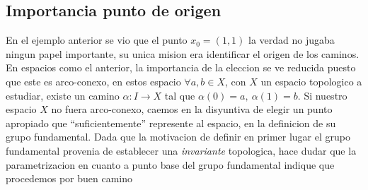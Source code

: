 \subsection{Importancia punto de origen}
En el ejemplo anterior se vio que el punto \(x_0 = (1,1)\) la verdad no
jugaba ningun papel importante, su unica mision era identificar el
origen de los caminos. En espacios como el anterior, la importancia de
la eleccion se ve reducida puesto que este es arco-conexo, en estos
espacio \(\forall a,b \in X\), con \(X\) un espacio topologico a
estudiar, existe un camino \(\alpha : I \to X\) tal que \(\alpha (0) =
a,\ \alpha (1) = b\). Si nuestro espacio \(X\) no fuera arco-conexo,
caemos en la disyuntiva de elegir un punto apropiado que
``suficientemente'' represente al espacio, en la definicion de su grupo
fundamental. Dada que la motivacion de definir en primer lugar el grupo
fundamental provenia de establecer una \emph{invariante} topologica,
hace dudar que la parametrizacion en cuanto a punto base del grupo
fundamental indique que procedemos por buen camino

